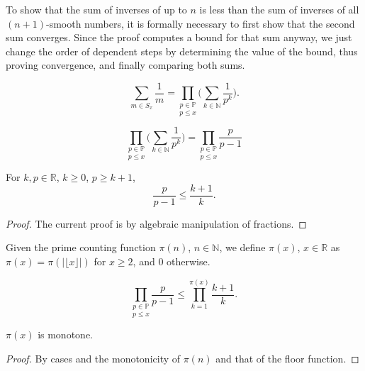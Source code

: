 To show that the sum of inverses of up to $n$ is less than the sum of inverses of all $(n+1)$-smooth
numbers, it is formally necessary to first show that the second sum converges. Since the proof computes
a bound for that sum anyway, we just change the order of dependent steps by determining the value of
the bound, thus proving convergence, and finally comparing both sums.

\begin{lemma}
\label{lem:lemma2}
\leanok
    $$\sum_{m\in S_x}\frac{1}{m} = \underset{p\le x}{\prod_{p\in\mathbb{P}}}\Big(\sum_{k\in\mathbb{N}}\frac{1}{p^k}\Big).$$
\end{lemma}

\begin{lemma}
\label{lem:lemma3}
\leanok
    $$\underset{p\le x}{\prod_{p\in\mathbb{P}}}\Big(\sum_{k\in\mathbb{N}}\frac{1}{p^k}\Big) = \underset{p\le x}{\prod_{p\in\mathbb{P}}}\frac{p}{p-1}$$
\end{lemma}

\begin{lemma}
\label{lem:lemma4-1}
\leanok
For $k,p \in\mathbb{R}$, $k\ge0$, $p \ge k+1$,
$$\frac{p}{p-1} \le \frac{k+1}{k}.$$
\end{lemma}
\begin{proof}
\leanok
The current proof is by algebraic manipulation of fractions.
\end{proof}

\begin{definition-pre}
\label{def:piReal}
Given the prime counting function $\pi(n)$, $n\in\mathbb{N}$, we define $\pi(x)$, $x\in\mathbb{R}$ as $\pi(x) = \pi(|\lfloor x\rfloor|)$ for $x\ge2$, and $0$ otherwise.
\end{definition-pre}

\begin{lemma}
\label{lem:lemma4}
$$\underset{p\le x}{\prod_{p\in\mathbb{P}}}\frac{p}{p-1} \le \prod_{k=1}^{\pi(x)}\frac{k+1}{k}.$$
\end{lemma}

\begin{lemma}
\label{lem:lemma5-2-1}
\leanok
$\pi(x)$ is monotone.
\end{lemma}
\begin{proof}
\leanok
By cases and the monotonicity of $\pi(n)$ and that of the floor function.
\end{proof}

